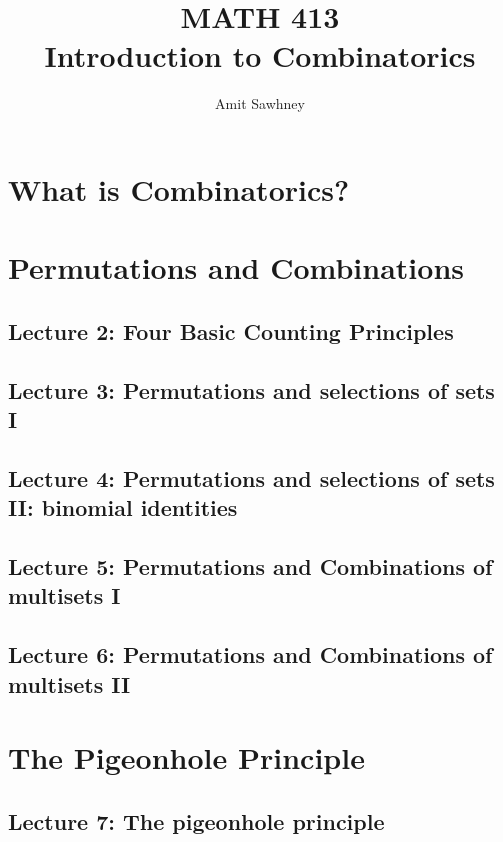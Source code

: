 \documentclass{report}
\title{\Huge{MATH 413}\\Introduction to Combinatorics}
\author{\huge{Amit Sawhney}}
\date{}
\begin{document}
\maketitle
\newpage%
\tableofcontents
\pagebreak

\chapter{What is Combinatorics?}

\chapter{Permutations and Combinations}

\section{Lecture 2: Four Basic Counting Principles}

\section{Lecture 3: Permutations and selections of sets I}

\section{Lecture 4: Permutations and selections of sets II: binomial identities}

\section{Lecture 5: Permutations and Combinations of multisets I}

\section{Lecture 6: Permutations and Combinations of multisets II}

\chapter{The Pigeonhole Principle}

\section{Lecture 7: The pigeonhole principle}
\end{document}

